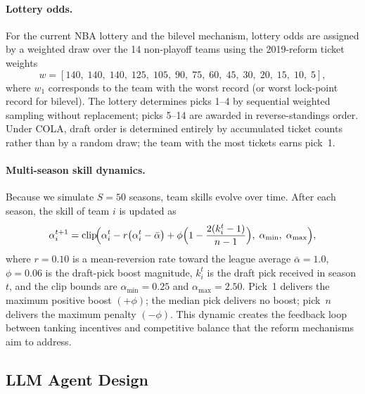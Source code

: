 \paragraph{Lottery odds.}
For the current NBA lottery and the bilevel mechanism, lottery odds are
assigned by a weighted draw over the 14 non-playoff teams using the
2019-reform ticket weights
\[
    w = [140,\; 140,\; 140,\; 125,\; 105,\; 90,\; 75,\; 60,\;
         45,\; 30,\; 20,\; 15,\; 10,\; 5],
\]
where $w_1$ corresponds to the team with the worst record (or worst lock-point
record for bilevel).
The lottery determines picks 1--4 by sequential weighted sampling without
replacement; picks 5--14 are awarded in reverse-standings order.
Under COLA, draft order is determined entirely by accumulated ticket counts
rather than by a random draw; the team with the most tickets earns pick~1.

\paragraph{Multi-season skill dynamics.}
Because we simulate $S = 50$ seasons, team skills evolve over time.
After each season, the skill of team $i$ is updated as
\[
    \alpha_i^{t+1}
    = \operatorname{clip}\!\Bigl(
        \alpha_i^t
        - r\bigl(\alpha_i^t - \bar{\alpha}\bigr)
        + \phi\Bigl(1 - \frac{2(k_i^t - 1)}{n - 1}\Bigr),\;
        \alpha_{\min},\; \alpha_{\max}
      \Bigr),
\]
where $r = 0.10$ is a mean-reversion rate toward the league average
$\bar{\alpha} = 1.0$, $\phi = 0.06$ is the draft-pick boost magnitude,
$k_i^t$ is the draft pick received in season $t$, and the clip bounds are
$\alpha_{\min} = 0.25$ and $\alpha_{\max} = 2.50$.
Pick~1 delivers the maximum positive boost $(+\phi)$; the median pick delivers
no boost; pick~$n$ delivers the maximum penalty $(-\phi)$.
This dynamic creates the feedback loop between tanking incentives and
competitive balance that the reform mechanisms aim to address.

\subsection{LLM Agent Design}


